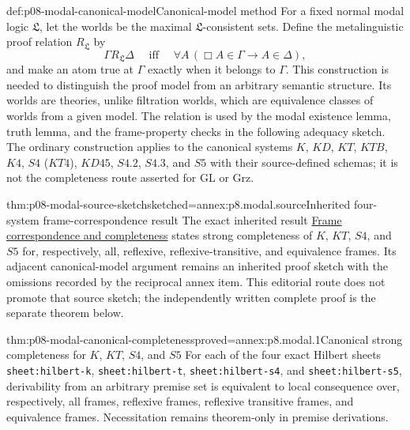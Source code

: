 \begin{hbmethod}{def:p08-modal-canonical-model}{Canonical-model method}
For a fixed normal modal logic \(\mathfrak L\), let the worlds be the maximal
\(\mathfrak L\)-consistent sets.  Define the metalinguistic proof relation
\(R_{\mathfrak L}\) by
\[
 \Gamma R_{\mathfrak L}\Delta
 \quad\text{ iff }\quad
 \forall A\,(\Box A\in\Gamma\to A\in\Delta),
\]
and make an atom true at \(\Gamma\) exactly when it belongs to \(\Gamma\).
This construction is needed to distinguish the proof model from an arbitrary
semantic structure.  Its worlds are theories, unlike filtration worlds, which
are equivalence classes of worlds from a given model.  The relation is used by
the modal existence lemma, truth lemma, and the frame-property checks in the
following adequacy sketch.  The ordinary construction applies to the canonical
systems \(K\), \(KD\), \(KT\), \(KTB\), \(K4\), \(S4\) (\(KT4\)),
\(KD45\), \(S4.2\), \(S4.3\), and \(S5\) with their source-defined
schemas; it is not the completeness route asserted for GL or Grz.
\end{hbmethod}

\begin{hbtheorem}{thm:p08-modal-source-sketch}{sketched=annex:p8.modal.source}{Inherited four-system frame-correspondence result}
The exact inherited result
\hyperref[thm:p08-source-modal-four-adequacy]{Frame correspondence and
completeness} states strong completeness of \(K\), \(KT\), \(S4\), and \(S5\)
for, respectively, all, reflexive, reflexive-transitive, and equivalence
frames.  Its adjacent canonical-model argument remains an inherited proof
sketch with the omissions recorded by the reciprocal annex item.  This
editorial route does not promote that source sketch; the independently written
complete proof is the separate theorem below.
\end{hbtheorem}

\begin{hbtheorem}{thm:p08-modal-canonical-completeness}{proved=annex:p8.modal.1}{Canonical strong completeness for \(K\), \(KT\), \(S4\), and \(S5\)}
For each of the four exact Hilbert sheets
\texttt{sheet:hilbert-k}, \texttt{sheet:hilbert-t},
\texttt{sheet:hilbert-s4}, and \texttt{sheet:hilbert-s5}, derivability from an
arbitrary premise set is equivalent to local consequence over, respectively,
all frames, reflexive frames, reflexive transitive frames, and equivalence
frames.  Necessitation remains theorem-only in premise derivations.
\end{hbtheorem}

